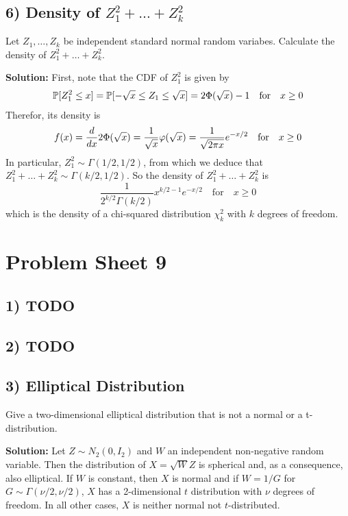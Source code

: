 %
%
\subsection*{6) Density of $Z_1^2 + \dots + Z_k^2$}
Let $Z_1, \dots, Z_k$ be independent standard normal random variabes. Calculate the density of $Z_1^2 + \dots + Z_k^2$.

\textbf{Solution:} First, note that the CDF of $Z_1^2$ is given by
\begin{align*}
    \mathbb{P}[Z_1^2 \leq x] = \mathbb{P}[-\sqrt{x} \leq Z_1 \leq \sqrt{x}]
    = 2\Phi(\sqrt{x}) - 1 \quad \text{for} \quad x \geq 0
\end{align*}
Therefor, its density is
\[
    f(x) = \frac{d}{dx}2 \Phi(\sqrt{x}) = \frac{1}{\sqrt{x}}\varphi(\sqrt{x}) \\
    = \frac{1}{\sqrt{2\pi x}}e^{-x/2} \quad \text{for} \quad x\geq 0
\]
In particular, $Z^2_1\sim\Gamma(1/2, 1/2)$, from which we deduce that $Z_1^2 + \dots + Z_k^2 \sim \Gamma(k/2, 1/2)$. So the density of  $Z_1^2 + \dots + Z_k^2$ is
\[
    \frac{1}{2^{k/2}\Gamma(k/2)}x^{k/2 - 1}e^{-x/2} \quad \text{for} \quad x \geq 0
\]
which is the density of a chi-squared distribution $\chi_k^2$ with $k$ degrees of freedom.

%
%
\section*{Problem Sheet 9}
%
%
\subsection*{1) TODO}
%
%
\subsection*{2) TODO}
%
%
\subsection*{3) Elliptical Distribution}
Give a two-dimensional elliptical distribution that is not a normal or a t-distribution.

\textbf{Solution:} Let $Z\sim N_2(0, I_2)$ and $W$ an independent non-negative random variable. Then the distribution of $X = \sqrt{W}Z$ is spherical and, as a consequence, also elliptical. If $W$ is constant, then $X$ is normal and if $W = 1 / G$ for $G \sim \Gamma(\nu/2, \nu/2)$, $X$ has a 2-dimensional $t$ distribution with $\nu$ degrees of freedom. In all other cases, $X$ is neither normal not $t$-distributed.


